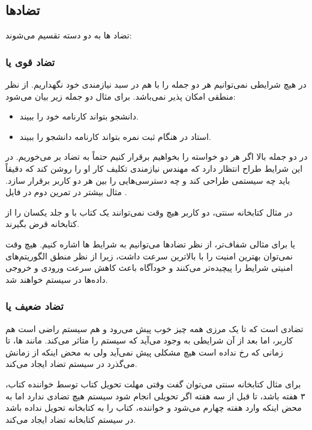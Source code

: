 \subsection{تضاد‌ها}

تضاد ها به دو دسته تقسیم می‌شوند:

\subsubsection{تضاد قوی یا }

در هیچ شرایطی نمی‌توانیم هر دو جمله را با هم در سبد نیازمندی خود نگهداریم. از
نظر منطقی امکان پذیر نمی‌باشد. برای مثال دو جمله زیر بیان می‌شود:

\begin{itemize}
    \item دانشجو بتواند کارنامه خود را ببیند.
    \item استاد در هنگام ثبت نمره بتواند کارنامه دانشجو را ببیند.
\end{itemize}

در دو جمله بالا اگر هر دو خواسته را بخواهیم برقرار کنیم حتماً به تضاد بر
می‌خوریم. در این شرایط طراح انتظار دارد که مهندس نیازمندی تکلیف کار او را روشن
کند که دقیقاً باید چه سیستمی طراحی کند و چه دسترسی‌هایی را بین هر دو کاربر
برقرار سازد. مثال بیشتر در تمرین دوم در فایل .

در مثال کتابخانه سنتی، دو کاربر هیچ وقت نمی‌توانند یک کتاب با  و جلد
یکسان را از کتابخانه قرض بگیرند.

یا برای مثالی شفاف‌تر، از نظر تضاد‌ها می‌توانیم به شرایط ها اشاره کنیم.
هیچ وقت نمی‌توان بهترین امنیت را با بالاترین سرعت داشت، زیرا از نظر منطق
الگوریتم‌های امنیتی شرایط را پیچیده‌تر می‌کنند و خودآگاه باعث کاهش سرعت ورودی و
خروجی داده‌ها در سیستم خواهند شد.

\subsubsection{تضاد ضعیف یا }

تضادی است که تا یک مرزی همه چیز خوب پیش می‌رود و هم سیستم راضی است هم کاربر، اما
بعد از آن شرایطی به وجود می‌آید که سیستم را متاثر می‌کند. مانند ها،
تا زمانی که رخ نداده است هیچ مشکلی پیش نمی‌آید ولی به محض اینکه از زمانش می‌گذرد
در سیستم تضاد ایجاد می‌کند.

برای مثال کتابخانه سنتی می‌توان گفت وقتی مهلت تحویل کتاب توسط خواننده کتاب، ۳
هفته باشد، تا قبل از سه هفته اگر تحویلی انجام شود سیستم هیچ تضادی ندارد اما به
محض اینکه وارد هفته چهارم می‌شود و خواننده، کتاب را به کتابخانه تحویل نداده باشد
در سیستم کتابخانه تضاد ایجاد می‌کند.

